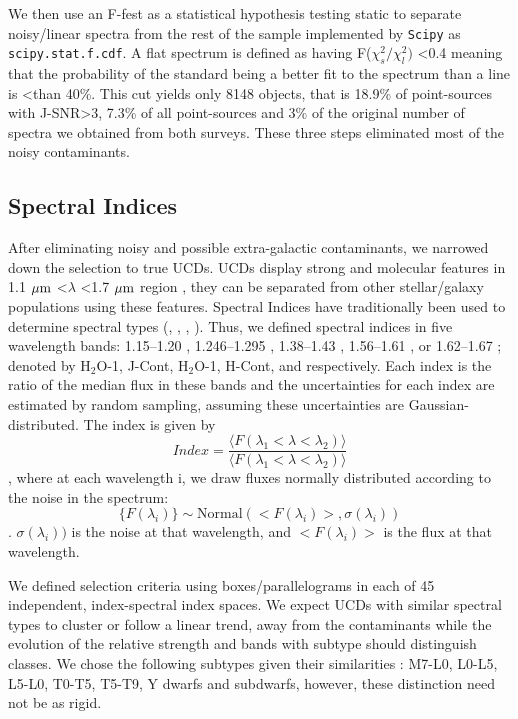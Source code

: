\documentclass[manuscript]{aastex63}
\begin{document}
 We then use an F-fest as a statistical hypothesis testing static to separate noisy/linear spectra from the rest of the sample implemented by \texttt{Scipy} \citealt{scipy} as \texttt{scipy.stat.f.cdf}. A flat spectrum is defined as having F($\chi^2_s/ \chi ^2 _l)$ \textless 0.4 meaning that the probability of the standard being a better fit to the spectrum than a line is \textless than 40\%. This cut yields only 8148 objects, that is 18.9\% of point-sources with J-SNR\textgreater3, 7.3\% of all point-sources and 3\% of the original number of spectra we obtained from both surveys. These three steps eliminated most of the noisy contaminants.

\subsection{Spectral Indices}

After eliminating noisy and possible extra-galactic contaminants, we narrowed down the selection to true UCDs. UCDs display strong \meth and \wat molecular features in 1.1 $\mbox{$\mu$m}$ \textless $\lambda$ \textless 1.7 $\mbox{$\mu$m}$  region \citep{2001PhDT.......116B}, they can be separated from other stellar/galaxy populations using these features. Spectral Indices have traditionally been used to determine spectral types (\citealt{1999AJ....117.1010T}, \citealt{2000AJ....119.3019C}, \citealt{2007ApJ...657..511A}, \citealt{2007ApJ...658..557B}). Thus, we defined  spectral indices in five wavelength bands: 1.15--1.20 \micron, 1.246--1.295 \micron, 1.38--1.43 \micron,  1.56--1.61 \micron, or 1.62--1.67 \micron; denoted by H$_2$O-1, J-Cont, H$_2$O-1, H-Cont, and \meth respectively. Each index is the ratio of the median flux in these bands and the uncertainties for each index are estimated by random sampling, assuming these uncertainties are Gaussian-distributed. The index is
 given by \begin{equation} Index=\frac{ \langle  F(\lambda_1<\lambda < \lambda_2) \rangle }{  \langle F(\lambda_1 < \lambda <\lambda_2) \rangle }\end{equation}, where at each wavelength i, we draw fluxes normally distributed according to the noise in the spectrum: \begin{equation} \{F(\lambda _i)\} \sim \text{Normal} (<F(\lambda_i)>, \sigma(\lambda_i )) \end{equation}. $\sigma(\lambda_i ))$ is the noise at that wavelength, and $<F(\lambda_i )>$ is the flux at that wavelength.

We defined selection criteria using boxes/parallelograms in each of 45 independent, index-spectral index spaces. We expect UCDs with similar spectral types to cluster or follow a linear trend, away from the contaminants while the evolution of the relative strength \wat and \meth bands with subtype should distinguish classes. We chose the following subtypes given their similarities : M7-L0, L0-L5, L5-L0, T0-T5, T5-T9, Y dwarfs and subdwarfs, however, these distinction need not be as rigid.
\end{document}
